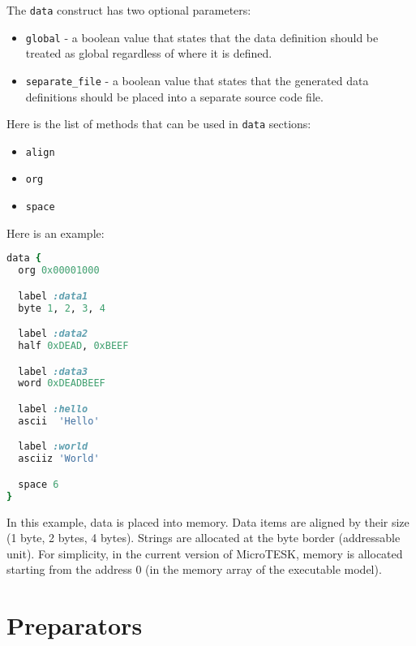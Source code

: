 \documentclass[oneside,final,12pt]{extreport}
\begin{document}
The \texttt{data} construct has two optional parameters:

\begin{itemize}
\item \texttt{global} - a boolean value that states that the data definition should be
      treated as global regardless of where it is defined.
\item \texttt{separate{\_}file} - a boolean value that states that the generated data
      definitions should be placed into a separate source code file.
\end{itemize}

Here is the list of methods that can be used in \texttt{data} sections:

\begin{itemize}
\item \texttt{align}
\item \texttt{org}
\item \texttt{space}
\end{itemize}

Here is an example:

\begin{lstlisting}[language=ruby]
data {
  org 0x00001000

  label :data1
  byte 1, 2, 3, 4

  label :data2
  half 0xDEAD, 0xBEEF

  label :data3
  word 0xDEADBEEF

  label :hello
  ascii  'Hello'

  label :world
  asciiz 'World'

  space 6
}
\end{lstlisting}

In this example, data is placed into memory. Data items are aligned by their size
(1 byte, 2 bytes, 4 bytes). Strings are allocated at the byte border (addressable
unit). For simplicity, in the current version of MicroTESK, memory is allocated
starting from the address 0 (in the memory array of the executable model).


\section{Preparators}

\end{document}
